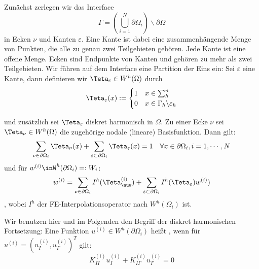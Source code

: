 Zunächst zerlegen wir das Interface 
\[
  \Gamma = \left( \bigcup_{i=1}^N \partial\Omega_i \right) \backslash \partial\Omega
\]
in Ecken $\nu$ und Kanten $\varepsilon$. Eine Kante ist dabei eine zusammenhängende Menge von Punkten, die alle zu genau zwei Teilgebieten gehören. Jede Kante ist eine offene Menge. Ecken sind Endpunkte von Kanten und gehören zu mehr als zwei Teilgebieten. Wir führen auf dem Interface eine Partition der Eins ein: 
Sei $\varepsilon$ eine Kante, dann definieren wir $\Teta_{\varepsilon} \in W^h(\Omega)$ durch
\[
  \Teta_{\varepsilon}(x):= 
  \begin{cases}
    1 &x\in \sum_h^n\\
    0 &x\in \Gamma_h\backslash\varepsilon_h
  \end{cases}
\]

und zusätzlich sei $\Teta_\varepsilon$ diskret harmonisch in $\Omega$. Zu einer Ecke $\nu$ sei $\Teta_\nu\in W^h(\Omega)$ die zugehörige nodale (lineare) Basisfunktion. Dann gilt: 
\[
  \sum_{\nu\in\partial\Omega_i} \Teta_\nu(x) + \sum_{\varepsilon\subset\partial\Omega_i} \Teta_\varepsilon(x) =1 \quad \forall x\in \partial\Omega_i, i=1,\cdots,N
\]
und für $w^{(i)}\inW^h(\partial\Omega_i)=: W_i$:
\[
  w^{(i)}=\sum_{\nu\in\partial\Omega_i} I^h(\Teta_\nuw^{(i)})+\sum_{\varepsilon\subset\partial\Omega_i} I^h(\Teta_\varepsilon)w^{(i)})
\],
wobei $I^h$ der FE-Interpolationsoperator nach $W^h(\Omega_i)$ ist. 


Wir benutzen hier und im Folgenden den Begriff der diskret harmonischen Fortsetzung: 
Eine Funktion $u^{(i)}\in W^h(\partial\Omega_i)$ heißt , wenn für $u^{(i)}=(u_I^{(i)},u_\Gamma^{(i)})^T$ gilt:
\[
  K_{II}^{(i)}u_I^{(i)}+K_{I\Gamma}^{(i)}u_\Gamma^{(i)} = 0 
\]
